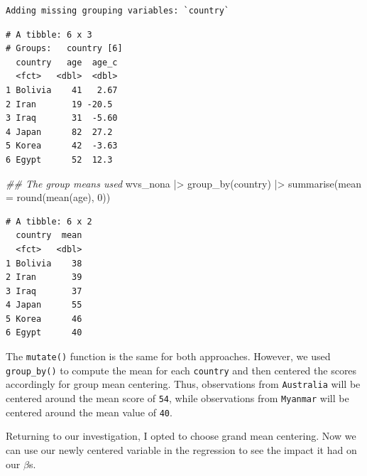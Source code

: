 \documentclass[
  letterpaper,
  DIV=11,
  numbers=noendperiod]{scrreprt}
\newenvironment{Shaded}{\begin{snugshade}}{\end{snugshade}}
\newcommand{\AttributeTok}[1]{\textcolor[rgb]{0.40,0.45,0.13}{#1}}
\newcommand{\DecValTok}[1]{\textcolor[rgb]{0.68,0.00,0.00}{#1}}
\newcommand{\DocumentationTok}[1]{\textcolor[rgb]{0.37,0.37,0.37}{\textit{#1}}}
\newcommand{\FunctionTok}[1]{\textcolor[rgb]{0.28,0.35,0.67}{#1}}
\newcommand{\NormalTok}[1]{\textcolor[rgb]{0.00,0.23,0.31}{#1}}
\newcommand{\SpecialCharTok}[1]{\textcolor[rgb]{0.37,0.37,0.37}{#1}}
\begin{document}
\begin{verbatim}
Adding missing grouping variables: `country`
\end{verbatim}

\begin{verbatim}
# A tibble: 6 x 3
# Groups:   country [6]
  country   age  age_c
  <fct>   <dbl>  <dbl>
1 Bolivia    41   2.67
2 Iran       19 -20.5 
3 Iraq       31  -5.60
4 Japan      82  27.2 
5 Korea      42  -3.63
6 Egypt      52  12.3 
\end{verbatim}

\begin{Shaded}
\begin{Highlighting}[]
\DocumentationTok{\#\# The group means used}
\NormalTok{wvs\_nona }\SpecialCharTok{|\textgreater{}}
  \FunctionTok{group\_by}\NormalTok{(country) }\SpecialCharTok{|\textgreater{}}
  \FunctionTok{summarise}\NormalTok{(}\AttributeTok{mean =} \FunctionTok{round}\NormalTok{(}\FunctionTok{mean}\NormalTok{(age), }\DecValTok{0}\NormalTok{))}
\end{Highlighting}
\end{Shaded}

\begin{verbatim}
# A tibble: 6 x 2
  country  mean
  <fct>   <dbl>
1 Bolivia    38
2 Iran       39
3 Iraq       37
4 Japan      55
5 Korea      46
6 Egypt      40
\end{verbatim}

The \texttt{mutate()} function is the same for both approaches. However,
we used \texttt{group\_by()} to compute the mean for each
\texttt{country} and then centered the scores accordingly for group mean
centering. Thus, observations from \texttt{Australia} will be centered
around the mean score of \texttt{54}, while observations from
\texttt{Myanmar} will be centered around the mean value of \texttt{40}.

Returning to our investigation, I opted to choose grand mean centering.
Now we can use our newly centered variable in the regression to see the
impact it had on our \(\beta\)s.
\end{document}

